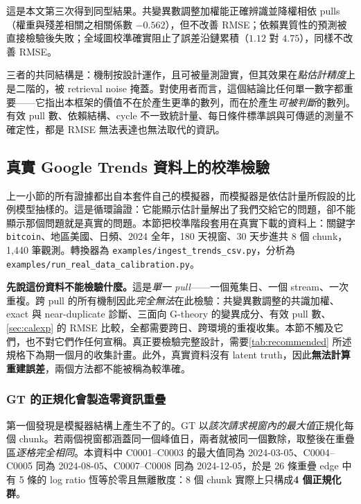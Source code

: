 \documentclass[12pt,a4paper,oneside]{article}
\begin{document}
\begin{remark}
\label{rem:pattern}
這是本文第三次得到同型結果。共變異數調整加權能正確辨識並降權相依 pulls（權重與殘差相關之相關係數 $-0.562$），但不改善 RMSE；依賴異質性的預測被直接檢驗後失敗；全域圖校準確實阻止了誤差沿鏈累積（$1.12$ 對 $4.75$），同樣不改善 RMSE。

三者的共同結構是：機制按設計運作，且可被量測證實，但其效果在\emph{點估計精度}上是二階的，被 retrieval noise 掩蓋。對使用者而言，這個結論比任何單一數字都重要——它指出本框架的價值不在於產生更準的數列，而在於產生\emph{可被判斷}的數列。有效 pull 數、依賴結構、cycle 不一致統計量、每日條件標準誤與可傳遞的測量不確定性，都是 RMSE 無法表達也無法取代的資訊。
\end{remark}

\subsection{真實 Google Trends 資料上的校準檢驗}
\label{sec:realdata}

上一小節的所有證據都出自本套件自己的模擬器，而模擬器是依估計量所假設的比例模型抽樣的。這是循環論證：它能顯示估計量解出了我們交給它的問題，卻不能顯示那個問題就是真實的問題。本節把校準階段套用在真實下載的資料上：關鍵字 \texttt{bitcoin}、地區美國、日頻、2024 全年，180 天視窗、30 天步進共 8 個 chunk，1{,}440 筆觀測。轉換器為 \texttt{examples/\allowbreak ingest\_\allowbreak trends\_\allowbreak csv.py}，分析為 \texttt{examples/\allowbreak run\_\allowbreak real\_\allowbreak data\_\allowbreak calibration.py}。

\textbf{先說這份資料不能檢驗什麼。}這是\emph{單一 pull}——一個蒐集日、一個 stream、一次重複。跨 pull 的所有機制因此\emph{完全無法}在此檢驗：共變異數調整的共識加權、exact 與 near-duplicate 診斷、三面向 G-theory 的變異成分、有效 pull 數、\cref{sec:calexp} 的 RMSE 比較，全都需要跨日、跨環境的重複收集。本節不觸及它們，也不對它們作任何宣稱。真正要檢驗完整設計，需要\cref{tab:recommended} 所述規格下為期一個月的收集計畫。此外，真實資料沒有 latent truth，因此\textbf{無法計算重建誤差}，兩個方法都不能被稱為較準確。

\subsubsection{GT 的正規化會製造零資訊重疊}

第一個發現是模擬器結構上產生不了的。GT 以\emph{該次請求視窗內的最大值}正規化每個 chunk。若兩個視窗都涵蓋同一個峰值日，兩者就被同一個數除，取整後在重疊區\emph{逐格完全相同}。本資料中 C0001--C0003 的最大值同為 2024-03-05、C0004--C0005 同為 2024-08-05、C0007--C0008 同為 2024-12-05，於是 26 條重疊 edge 中有 5 條的 log ratio 恆等於零且無離散度：8 個 chunk 實際上只構成\textbf{4 個正規化群}。
\end{document}
